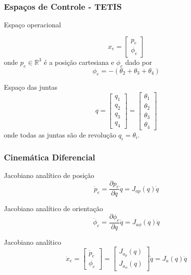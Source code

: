 \documentclass{beamer}
\newcommand\m[1]{\begin{bmatrix}#1\end{bmatrix}}
\begin{document}
\begin{frame}
\frametitle{Espaços de Controle - TETIS}

\begin{block}{Espaço operacional}

\begin{equation} \label{eq:operational_space}
{x_e} = \m{{p}_e \\ \phi_e}
\end{equation}
onde ${p}_e \in \mathbb{R}^3$ é a posição cartesiana e ${\phi}_e$ dado por
\begin{equation} \label{eq:orientacao} %
\phi_e = -(\theta_2 + \theta_3 + \theta_4)
\end{equation}
\end{block}

\begin{block}{Espaço das juntas}
\begin{equation} \label{eq:joint_space}
{q} = \m{q_1 \\ q_2 \\ q_3 \\ q_4} = \m{ \theta_1 \\ \theta_2 \\ \theta_3 \\ \theta_4}
\end{equation} 
onde todas as juntas são de revolução $q_i = \theta_i$.
\end{block}
\end{frame}

\begin{frame}
\frametitle{Cinemática Diferencial}
\begin{block}{Jacobiano analítico de posição}
\begin{equation} \label{eq:jacob_pos}
\dot{{p}}_e = \frac{\partial {p}_e }{\partial {q}} {\dot{q}} = {J}_{ap} ({q}) {\dot{q}} 
\end{equation}
\end{block}

\begin{block}{Jacobiano analítico de orientação}
\begin{equation} \label{eq:jacob_or}
\dot{{\phi}}_e = \frac{\partial {\phi}_e}{\partial {q}} {\dot{q}} = {J}_{a\phi}({q}){\dot{q}}
\end{equation}
\end{block}

\begin{block}{Jacobiano analítico}
\begin{equation} \label{eq:jacoba}
\dot{x}_e = \m{ \dot{p}_e \\ \phi_e } = \m{ J_{a_p}(q) \\ J_{a_\phi}(q)} {\dot{q}} = {J}_a ({q}) \dot{{q}}
\end{equation}
\end{block}
\end{frame}
\end{document}
